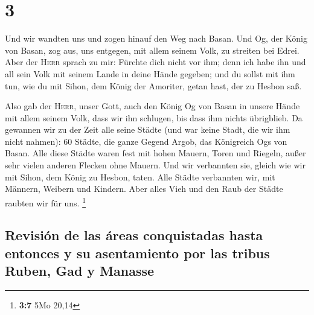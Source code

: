 \hypertarget{section-2}{%
\section{3}\label{section-2}}

 Und wir wandten uns und zogen hinauf den Weg nach Basan.
Und Og, der König von Basan, zog aus, uns entgegen, mit allem seinem
Volk, zu streiten bei Edrei.  Aber der \textsc{Herr}
sprach zu mir: Fürchte dich nicht vor ihm; denn ich habe ihn und all
sein Volk mit seinem Lande in deine Hände gegeben; und du sollst mit ihm
tun, wie du mit Sihon, dem König der Amoriter, getan hast, der zu Hesbon
saß.

 Also gab der \textsc{Herr}, unser Gott, auch den König Og
von Basan in unsere Hände mit allem seinem Volk, dass wir ihn schlugen,
bis dass ihm nichts übrigblieb.  Da gewannen wir zu der
Zeit alle seine Städte (und war keine Stadt, die wir ihm nicht nahmen):
60 Städte, die ganze Gegend Argob, das Königreich Ogs von Basan.
 Alle diese Städte waren fest mit hohen Mauern, Toren und
Riegeln, außer sehr vielen anderen Flecken ohne Mauern. 
Und wir verbannten sie, gleich wie wir mit Sihon, dem König zu Hesbon,
taten. Alle Städte verbannten wir, mit Männern, Weibern und Kindern.
 Aber alles Vieh und den Raub der Städte raubten wir für
uns. \footnote{\textbf{3:7} 5Mo 20,14}

\hypertarget{revisiuxf3n-de-las-uxe1reas-conquistadas-hasta-entonces-y-su-asentamiento-por-las-tribus-ruben-gad-y-manasse}{%
\subsection{Revisión de las áreas conquistadas hasta entonces y su
asentamiento por las tribus Ruben, Gad y
Manasse}\label{revisiuxf3n-de-las-uxe1reas-conquistadas-hasta-entonces-y-su-asentamiento-por-las-tribus-ruben-gad-y-manasse}}

